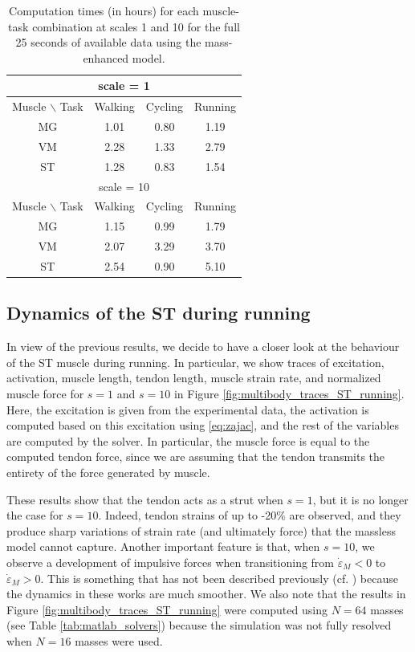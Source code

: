 \documentclass{sfuthesis}
\numberwithin{equation}{section}
\numberwithin{figure}{chapter}
\numberwithin{table}{chapter}
\theoremstyle{definition}
\newcommand{\depsilon}{\dot{\varepsilon}}
\begin{document}
\begin{table} 
    \centering
    \begin{tabular}{|c|c|c|c|}\hline
        \multicolumn{4}{|c|}{scale = 1} \\\hline
        Muscle $\backslash$ Task & Walking & Cycling & Running \\\hline
        MG & 1.01 & 0.80 & 1.19 \\\hline
        VM & 2.28 & 1.33 & 2.79 \\\hline
        ST & 1.28 & 0.83 & 1.54 \\\hline\hline
        \multicolumn{4}{|c|}{scale = 10} \\\hline
        Muscle $\backslash$ Task & Walking & Cycling & Running \\\hline
        MG & 1.15 & 0.99 & 1.79 \\\hline
        VM & 2.07 & 3.29 & 3.70 \\\hline
        ST & 2.54 & 0.90 & 5.10 \\\hline
    \end{tabular}
    \caption{Computation times (in hours) for each muscle-task combination at scales 1 and 10 for the full 25 seconds of available data using the mass-enhanced model.}
    \label{tab:multibody_computational_time}
\end{table}

\subsection{Dynamics of the ST during running}

In view of the previous results, we decide to have a closer look at the behaviour of the ST muscle during running. In particular, we show traces of excitation, activation, muscle length, tendon length, muscle strain rate, and normalized muscle force for $s=1$ and $s=10$ in Figure \ref{fig:multibody_traces_ST_running}. Here, the excitation is given from the experimental data, the activation is computed based on this excitation using \eqref{eq:zajac}, and the rest of the variables are computed by the solver. In particular, the muscle force is equal to the computed tendon force, since we are assuming that the tendon transmits the entirety of the force generated by muscle. 

These results show that the tendon acts as a strut when $s=1$, but it is no longer the case for $s=10$. Indeed, tendon strains of up to -20\% are observed, and they produce sharp variations of strain rate (and ultimately force) that the massless model cannot capture. Another important feature is that, when $s=10$, we observe a development of impulsive forces when transitioning from $\depsilon_M < 0$ to $\depsilon_M > 0$. This is something that has not been described previously (cf. \cite{EvanThesis,Ross2018}) because the dynamics in these works are much smoother. We also note that the results in Figure \ref{fig:multibody_traces_ST_running} were computed using $N=64$ masses (see Table \ref{tab:matlab_solvers}) because the simulation was not fully resolved when $N=16$ masses were used. 
\end{document}
